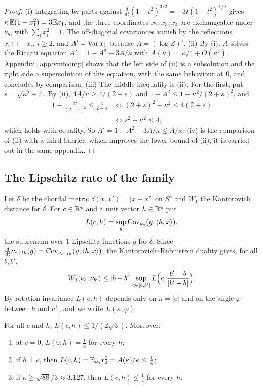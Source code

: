 \begin{proof}
(i) Integrating by parts against $\frac{d}{dt}(1-t^2)^{3/2}=-3t(1-t^2)^{1/2}$
gives $\kappa\,\mathbb{E}(1-x_1^2)=3\mathbb{E} x_1$, and the three coordinates
$x_2,x_3,x_4$ are exchangeable under $\nu_b$, with $\sum_ix_i^2=1$. The
off-diagonal covariances vanish by the reflections $x_i\mapsto-x_i$,
$i\ge2$, and $A'=\operatorname{Var} x_1$ because $A=(\log Z)'$.
(ii) By (i), $A$ solves the Riccati equation $A'=1-A^2-3A/\kappa$ with
$A(\kappa)=\kappa/4+O(\kappa^3)$. Appendix~\ref{app:vmfcomp} shows that the left
side of (ii) is a subsolution and the right side a supersolution of this
equation, with the same behaviour at $0$, and concludes by comparison.
(iii) The middle inequality is (ii). For the first, put $s=\sqrt{\kappa^2+4}$.
By (ii), $4A/\kappa\ge4/(2+s)$ and $1-A^2\le1-\kappa^2/(2+s)^2$, and
\[
\begin{aligned}
1-\frac{\kappa^2}{(2+s)^2}\le\frac4{2+s}
&\iff(2+s)^2-\kappa^2\le4(2+s)\\
&\iff s^2-\kappa^2\le4,
\end{aligned}
\]
which holds with equality. So $A'=1-A^2-3A/\kappa\le A/\kappa$.
(iv) is the comparison of (ii) with a third barrier, which improves the
lower bound of (ii); it is carried out in the same appendix.
\end{proof}

\subsection{The Lipschitz rate of the family}

Let $\delta$ be the chordal metric $\delta(x,x')=|x-x'|$ on $S^3$ and $W_1$
the Kantorovich distance for $\delta$. For $c\in\mathbb{R}^4$ and a unit vector
$h\in\mathbb{R}^4$ put
\begin{equation}\label{q-eq:rate}
L(c,h)=\sup_g\operatorname{Cov}_{\nu_c}\bigl(g,\langle h,x\rangle\bigr),
\end{equation}
the supremum over $1$-Lipschitz functions $g$ for $\delta$. Since
$\frac{d}{dt}\nu_{c+th}(g)=\operatorname{Cov}_{\nu_{c+th}}(g,\langle h,x\rangle)$, the
Kantorovich--Rubinstein duality gives, for all $b,b'$,
\begin{equation}\label{q-eq:w1segment}
W_1(\nu_b,\nu_{b'})\le|b-b'|\sup_{c\in[b,b']}L\Bigl(c,\frac{b'-b}{|b'-b|}
\Bigr).
\end{equation}
By rotation invariance $L(c,h)$ depends only on $\kappa=|c|$ and on the angle
$\varphi$ between $h$ and $c^\perp$, and we write $L(\kappa,\varphi)$.

\begin{lemma}\label{q-lem:rate}
For all $c$ and $h$, $L(c,h)\le1/(2\sqrt3)$. Moreover:
\begin{enumerate}[label=\textup{(\roman*)},leftmargin=*]
\item at $c=0$, $L(0,h)=\frac14$ for every $h$;
\item if $h\perp c$, then $L(c,h)=\mathbb{E}_{\nu_c}x_2^2=A(\kappa)/\kappa\le\frac14$;
\item if $\kappa\ge\sqrt{88}/3\approx3.127$, then $L(c,h)\le\frac14$ for
every $h$.
\end{enumerate}
\end{lemma}

